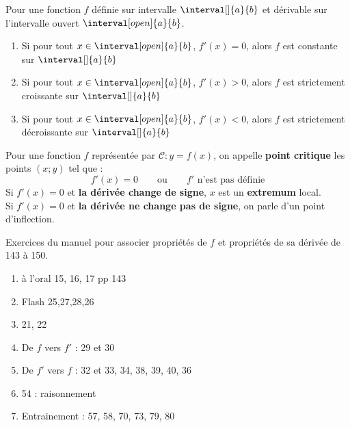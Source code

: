 \documentclass[main.tex]{subfiles}
\begin{document}
\begin{theorem}[admis]
	Pour une fonction $f$ définie sur   intervalle $\interval[]{a}{b}$ et dérivable sur l'intervalle ouvert $\interval[open]{a}{b}$.
	\begin{enumerate}[leftmargin=*,label=\textbullet]
		\item Si pour tout $x\in\interval[open]{a}{b}$,  $f'(x)=0$, alors $f$ est  constante sur $\interval[]{a}{b}$
		\item Si pour tout $x\in\interval[open]{a}{b}$,  $f'(x)>0$, alors $f$ est strictement croissante sur $\interval[]{a}{b}$
		\item Si pour tout $x\in\interval[open]{a}{b}$,  $f'(x)<0$, alors $f$ est strictement décroissante sur $\interval[]{a}{b}$
	\end{enumerate} 
\end{theorem}
\begin{definition} Pour une fonction $f$ représentée par $\mathscr{C}\colon y=f(x)$, on appelle \textbf{point critique} les points $(x;y)$  tel que  :
	\setlength{\abovedisplayskip}{3pt}
	\setlength{\belowdisplayskip}{3pt}
	$$
 f'(x)=0 \qquad \text{ou} \qquad f' \text{ n'est pas définie}
	$$ 
Si $f'(x)=0$ et \textbf{la dérivée change de signe}, $x$ est un \textbf{extremum} local.\\
Si $f'(x)=0$ et \textbf{la dérivée ne change pas de signe}, on parle d'un point d'inflection.
\end{definition}
 \newpage 
 \begin{remark} Exercices du manuel pour associer propriétés de $f$ et propriétés de sa dérivée de 143 à 150.
 	\begin{enumerate}[label=\textbullet,leftmargin=*]
 		\item à l'oral 15, 16, 17 pp 143
 		\item Flash 25,27,28,26
 		\item 21, 22
 		\item De $f$ vers $f'$ : 29 et 30
 		\item De $f'$ vers $f$ : 32 et 33, 34, 38, 39, 40, 36
 		\item 54 : raisonnement
 		\item Entrainement : 57, 58, 70, 73, 79, 80
 	\end{enumerate} 
 	
	\end{remark}
%	 
\newpage 
{}  
\pagestyle{scrheadings} %
\onehalfspacing
\end{document}
